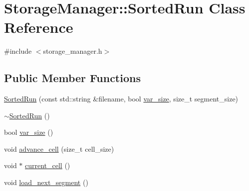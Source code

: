 \hypertarget{classStorageManager_1_1SortedRun}{}\section{Storage\+Manager\+:\+:Sorted\+Run Class Reference}
\label{classStorageManager_1_1SortedRun}


{\ttfamily \#include $<$storage\+\_\+manager.\+h$>$}

\subsection*{Public Member Functions}
\begin{DoxyCompactItemize}
\item 
\hyperlink{classStorageManager_1_1SortedRun_ad4850adcb8ed6a15c398e2177ba7b0eb}{Sorted\+Run} (const std\+::string \&filename, bool \hyperlink{classStorageManager_1_1SortedRun_a672abf3fff6ae9a06dff9ddc0574d06a}{var\+\_\+size}, size\+\_\+t segment\+\_\+size)
\item 
\hyperlink{classStorageManager_1_1SortedRun_a64c1393d6eed07d17725458a0c82be25}{$\sim$\+Sorted\+Run} ()
\item 
bool \hyperlink{classStorageManager_1_1SortedRun_a672abf3fff6ae9a06dff9ddc0574d06a}{var\+\_\+size} ()
\item 
void \hyperlink{classStorageManager_1_1SortedRun_a853b0dff5a76194007796add6a9b61d6}{advance\+\_\+cell} (size\+\_\+t cell\+\_\+size)
\item 
void $\ast$ \hyperlink{classStorageManager_1_1SortedRun_a5125983161d9ade779bd30eed8473ea7}{current\+\_\+cell} ()
\item 
void \hyperlink{classStorageManager_1_1SortedRun_a1e555f65df749c3affeeb595aa08c54d}{load\+\_\+next\+\_\+segment} ()
\end{DoxyCompactItemize}
